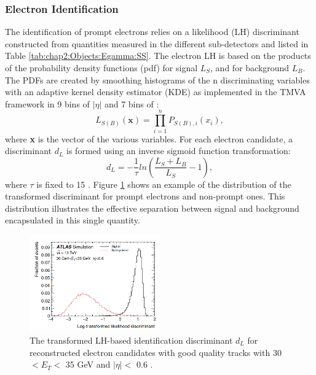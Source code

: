 \subsubsection{Electron Identification}
\label{chap2:Objects:Egamma:EID}
The identification of prompt electrons relies on a likelihood (LH) discriminant constructed from quantities measured in the different sub-detectors and listed in Table \ref{tab:chap2:Objects:Egamma:SS}. The electron LH is based on the products of the probability density functions (pdf) for signal $L_S$, and for background $L_B$. The PDFs are created by smoothing histograms of the n discriminating variables with an adaptive kernel density estimator (KDE) \cite{KDE} as implemented in the TMVA framework \cite{TMVA} in 9 bins of $|\eta|$ and 7 bins of \eT:
\begin{equation}
    L_{S(B)}(\textbf{x}) = \displaystyle\prod_{i=1}^{n} P_{S(B),i}(x_i),
\end{equation}
where \textbf{x} is the vector of the various variables. For each electron candidate, a discriminant $d_L$ is formed using an inverse sigmoid function transformation:
\begin{equation}
    d_L = -\frac{1}{\tau}ln(\frac{L_S+L_B}{L_S} - 1),
\end{equation}
where $\tau$ is fixed to 15 \cite{TMVA}. Figure \ref{fig:chap2:Objects:Egamma:EID:LH} shows an example of the distribution of the transformed discriminant for prompt electrons and non-prompt ones. This distribution illustrates the effective separation between signal and background encapsulated in this single quantity.
\begin{figure}[htbp]
    \centering
    \includegraphics[width=0.5\textwidth]{Ch2/Img/Electron_LH.png}
    \caption{The transformed LH-based identification discriminant $d_L$ for reconstructed electron candidates with good quality tracks with 30 $ < E_T < $ 35 GeV and $|\eta|<$ 0.6 \cite{Electron_ID_2016}.}
    \label{fig:chap2:Objects:Egamma:EID:LH}
\end{figure}
\\
